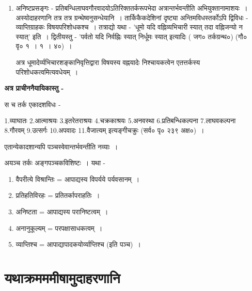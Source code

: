 {\begin{enumerate}
न्यायशास्त्रीयग्रन्थनिरूपणदृष्ट्या तु एवं प्रपञयितुं शक्यम् - यथा घटत्वं यदि यावद्धटहेतुवृत्ति स्यात् घटजन्यवृत्ति न स्यात् इति~। वृत्तिकारास्तु अनवस्था च अन्यवस्थितपरम्परारोपाधीनानिष्टप्रसङ्गः~। यथा यदि घटत्वम् घटजन्यत्वव्याप्यं स्यात् कपालसमवेतत्वव्याप्यं न स्यात् इत्याहुः (गौ० वृ० १~। १~। ४०)~। 
\item	अनिष्टप्रसङ्गः - प्रतिबन्धिलाघवगौरवादयोऽतिरिक्ततर्करूपभेदा अत्रान्तर्भवन्तीति  \break अभियुक्तानामाशयः~। अस्योदाहरणानि तत्र तत्र ग्रन्थेष्वनुसन्धेयानि~। तार्किकैकदेशिनां दृष्ट्या अन्तिमविधस्तर्कोऽपि द्विविधः -  व्याप्तिग्राहकः विषयपरिशोधकश्च~। तत्राद्यो यथा - 'धूमो यदि वह्निव्यभिचारी स्यात् तदा वह्निजन्यो न स्यात्' इति~। द्विती\-यस्तु - 'पर्वतो यदि निर्वह्निः स्यात् निर्धूमः स्यात् इत्यादिः ( जग० \hbox{तर्कग्रन्थ०}) (गौ० वृ० १~। १~। ४०)~। 

अत्र धूमादेर्व्यभिचारशङ्कानिवृत्तिद्वारा विषयस्य वह्नयादेः निश्चायकत्वेन एतत्तर्कस्य परिशोधकत्वमित्यवधेयम्~। 
\end{enumerate}

\textbf{अत्र प्राचीननैयायिकास्तु -}

स च तर्क एकादशविधः - 

1.व्याघातः 2.आत्माश्रयः 3.इतरेतराश्रयः 4.चक्रकाश्रयः 5.अनवस्था 6.प्रतिबन्धि\-कल्पना  7.लाघवकल्पना 8.गौरवम् 9.उत्सर्गः 10.अपवादः 11.वैजात्यम् इत्यङ्गीचक्रुः {(सर्व० पृ० २३९ अक्ष०)~।} 

एतान्येकादशान्यपि पञ्चस्वेवान्तर्भवन्तीति नव्याः~। 

अयञ्च तर्कः अङ्गपञ्चकविशिष्टः~। यथा - 
\begin{enumerate}
\itemsep=1pt
\item	वैपरीत्ये विश्रान्तिः = आपाद्यस्य विपर्यये पर्यवसानम्~। 
\item	प्रतिहतिविरहः = प्रतितर्कापराहतिः~। 
\item	अनिष्टता  = आपाद्यस्य परानिष्टत्वम्~। 
\item	अनानुकूल्यम् = परपक्षासाधकत्वम्~। 
\item	व्याप्तिश्च = आपाद्यापादकयोर्व्याप्तिश्च (इति पञ्च)~। 
\end{enumerate}

\section*{यथाक्रमममीषामुदाहरणानि} 

}
